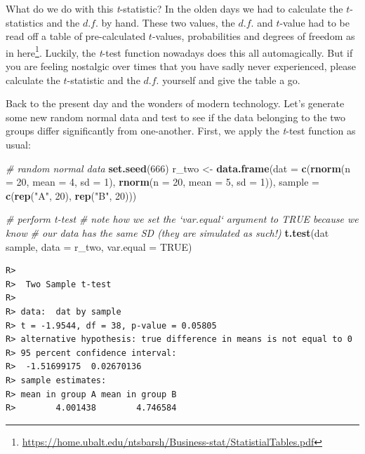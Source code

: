 \documentclass[english,10pt,a4paper,oneside]{book}
\renewcommand{\href}[2]{#2\footnote{\url{#1}}}
\let\rmarkdownfootnote\footnote%
\def\footnote{\protect\rmarkdownfootnote}
\newenvironment{Shaded}{\begin{snugshade}}{\end{snugshade}}
\newcommand{\KeywordTok}[1]{\textcolor[rgb]{0.13,0.29,0.53}{\textbf{#1}}}
\newcommand{\DataTypeTok}[1]{\textcolor[rgb]{0.13,0.29,0.53}{#1}}
\newcommand{\DecValTok}[1]{\textcolor[rgb]{0.00,0.00,0.81}{#1}}
\newcommand{\StringTok}[1]{\textcolor[rgb]{0.31,0.60,0.02}{#1}}
\newcommand{\CommentTok}[1]{\textcolor[rgb]{0.56,0.35,0.01}{\textit{#1}}}
\newcommand{\OtherTok}[1]{\textcolor[rgb]{0.56,0.35,0.01}{#1}}
\newcommand{\OperatorTok}[1]{\textcolor[rgb]{0.81,0.36,0.00}{\textbf{#1}}}
\newcommand{\NormalTok}[1]{#1}
\theoremstyle{definition}
\theoremstyle{definition}
\theoremstyle{definition}
\theoremstyle{remark}
\begin{document}
What do we do with this \emph{t}-statistic? In the olden days we had to
calculate the \(t\)-statistics and the \(d.f.\) by hand. These two
values, the \(d.f.\) and \(t\)-value had to be read off a table of
pre-calculated \(t\)-values, probabilities and degrees of freedom
\href{https://home.ubalt.edu/ntsbarsh/Business-stat/StatistialTables.pdf}{as
in here}. Luckily, the \emph{t}-test function nowadays does this all
automagically. But if you are feeling nostalgic over times that you have
sadly never experienced, please calculate the \(t\)-statistic and the
\(d.f.\) yourself and give the table a go.

Back to the present day and the wonders of modern technology. Let's
generate some new random normal data and test to see if the data
belonging to the two groups differ significantly from one-another.
First, we apply the \emph{t}-test function as usual:

\begin{Shaded}
\begin{Highlighting}[]
\CommentTok{# random normal data}
\KeywordTok{set.seed}\NormalTok{(}\DecValTok{666}\NormalTok{)}
\NormalTok{r_two <-}\StringTok{ }\KeywordTok{data.frame}\NormalTok{(}\DataTypeTok{dat =} \KeywordTok{c}\NormalTok{(}\KeywordTok{rnorm}\NormalTok{(}\DataTypeTok{n =} \DecValTok{20}\NormalTok{, }\DataTypeTok{mean =} \DecValTok{4}\NormalTok{, }\DataTypeTok{sd =} \DecValTok{1}\NormalTok{),}
                            \KeywordTok{rnorm}\NormalTok{(}\DataTypeTok{n =} \DecValTok{20}\NormalTok{, }\DataTypeTok{mean =} \DecValTok{5}\NormalTok{, }\DataTypeTok{sd =} \DecValTok{1}\NormalTok{)),}
                    \DataTypeTok{sample =} \KeywordTok{c}\NormalTok{(}\KeywordTok{rep}\NormalTok{(}\StringTok{"A"}\NormalTok{, }\DecValTok{20}\NormalTok{), }\KeywordTok{rep}\NormalTok{(}\StringTok{"B"}\NormalTok{, }\DecValTok{20}\NormalTok{)))}

\CommentTok{# perform t-test}
\CommentTok{# note how we set the `var.equal` argument to TRUE because we know }
\CommentTok{# our data has the same SD (they are simulated as such!)}
\KeywordTok{t.test}\NormalTok{(dat }\OperatorTok{~}\StringTok{ }\NormalTok{sample, }\DataTypeTok{data =}\NormalTok{ r_two, }\DataTypeTok{var.equal =} \OtherTok{TRUE}\NormalTok{)}
\end{Highlighting}
\end{Shaded}

\begin{verbatim}
R> 
R>  Two Sample t-test
R> 
R> data:  dat by sample
R> t = -1.9544, df = 38, p-value = 0.05805
R> alternative hypothesis: true difference in means is not equal to 0
R> 95 percent confidence interval:
R>  -1.51699175  0.02670136
R> sample estimates:
R> mean in group A mean in group B 
R>        4.001438        4.746584
\end{verbatim}
\end{document}
